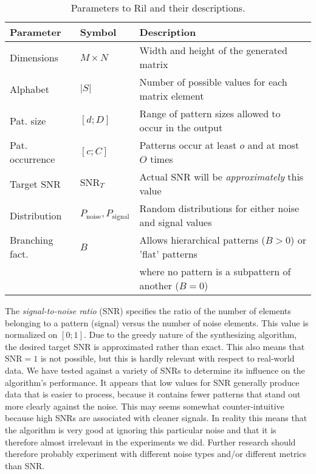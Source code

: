 \documentclass{llncs}
\begin{document}
\begin{table}
\caption{Parameters to Ril and their descriptions.}
\label{table:ril}
\begin{tabular*}{\textwidth}{lll}
\toprule
Parameter & Symbol & Description \\
\midrule
Dimensions & $M\times N$ & Width and height of the generated matrix \\
Alphabet & $|S|$ & Number of possible values for each matrix element \\
Pat. size & $[d;D]$ & Range of pattern sizes allowed to occur in the output \\
Pat. occurrence & $[c;C]$ & Patterns occur at least $o$ and at most $O$ times \\
Target SNR & $\mathrm{SNR}_T$ & Actual SNR will be \emph{approximately} this value \\
Distribution & $P_{\mathrm{noise}}, P_{\mathrm{signal}}$ & Random distributions for either noise and signal values \\
Branching fact. & $B$ & Allows hierarchical patterns ($B>0$) or 'flat' patterns \\
& & where no pattern is a subpattern of another ($B=0$) \\
\bottomrule
\end{tabular*}
\end{table}

The \emph{signal-to-noise ratio} (SNR) specifies the ratio of the number of elements belonging to a pattern (signal) versus the number of noise elements. This value is normalized on $[0;1]$. Due to the greedy nature of the synthesizing algorithm, the desired target SNR is approximated rather than exact. This also means that $\mathrm{SNR}=1$ is not possible, but this is hardly relevant with respect to real-world data. We have tested against a variety of SNRs to determine its influence on the algorithm's performance. It appears that low values for SNR generally produce data that is easier to process, because it contains fewer patterns that stand out more clearly against the noise. This may seems somewhat counter-intuitive because high SNRs are associated with cleaner signals. In reality this means that the algorithm is very good at ignoring this particular noise and that it is therefore almost irrelevant in the experiments we did. Further research should therefore probably experiment with different noise types and/or different metrics than SNR.
\end{document}
